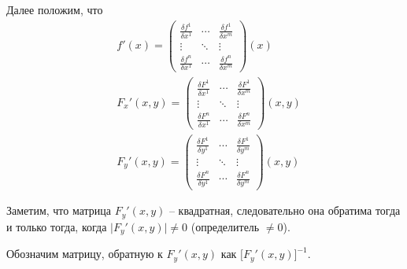 Далее положим, что
\begin{align*}
     & f'(x) = \left(\begin{matrix}
                         \frac{\delta f^1}{\delta x^1} & \cdots & \frac{\delta f^1}{\delta x^m} \\
                         \vdots                        & \ddots & \vdots                        \\
                         \frac{\delta f^n}{\delta x^1} & \cdots & \frac{\delta f^n}{\delta x^m}
                     \end{matrix}\right) (x)     \\
     & F_x'(x,y) = \left(\begin{matrix}
                             \frac{\delta F^1}{\delta x^1} & \cdots & \frac{\delta F^1}{\delta x^m} \\
                             \vdots                        & \ddots & \vdots                        \\
                             \frac{\delta F^n}{\delta x^1} & \cdots & \frac{\delta F^n}{\delta x^m}
                         \end{matrix}\right) (x,y) \\
     & F_y'(x,y) = \left(\begin{matrix}
                             \frac{\delta F^1}{\delta y^1} & \cdots & \frac{\delta F^1}{\delta y^m} \\
                             \vdots                        & \ddots & \vdots                        \\
                             \frac{\delta F^n}{\delta y^1} & \cdots & \frac{\delta F^n}{\delta y^m}
                         \end{matrix}\right) (x,y)
\end{align*}

Заметим, что матрица $ F_y'(x,y) $ -- квадратная, следовательно она обратима тогда и только тогда, когда $ \big|F_y'(x,y)\big| \ne 0 $ (определитель $ \ne 0 $).

Обозначим матрицу, обратную к $ F_y'(x,y) $ как $ \big[F_y'(x,y)\big]^{-1} $.

